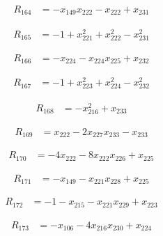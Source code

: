\begin{align*}
R_{164} &= -x_{149} x_{222} -x_{222} +x_{231}
\end{align*}

\begin{align*}
R_{165} &= -1 +x_{221}^{2} +x_{222}^{2} -x_{231}^{2}
\end{align*}

\begin{align*}
R_{166} &= -x_{224} -x_{224} x_{225} +x_{232}
\end{align*}

\begin{align*}
R_{167} &= -1 +x_{223}^{2} +x_{224}^{2} -x_{232}^{2}
\end{align*}

\begin{align*}
R_{168} &= -x_{216}^{2} +x_{233}
\end{align*}

\begin{align*}
R_{169} &= x_{222} -2 x_{227} x_{233} -x_{233}
\end{align*}

\begin{align*}
R_{170} &= -4 x_{222} -8 x_{222} x_{226} +x_{225}
\end{align*}

\begin{align*}
R_{171} &= -x_{149} -x_{221} x_{228} +x_{225}
\end{align*}

\begin{align*}
R_{172} &= -1 -x_{215} -x_{221} x_{229} +x_{223}
\end{align*}

\begin{align*}
R_{173} &= -x_{106} -4 x_{216} x_{230} +x_{224}
\end{align*}

